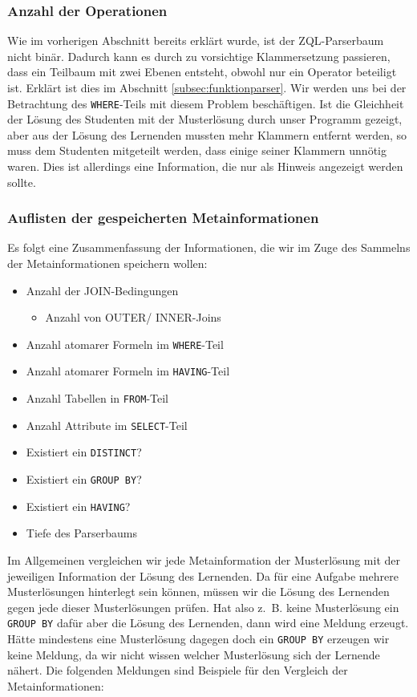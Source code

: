 \subsubsection*{Anzahl der Operationen}

Wie im vorherigen Abschnitt bereits erklärt wurde, ist der ZQL-Parserbaum nicht binär. Dadurch kann es durch zu vorsichtige Klammersetzung passieren, dass ein Teilbaum mit zwei Ebenen entsteht, obwohl nur ein Operator beteiligt ist. Erklärt ist dies im Abschnitt \ref{subsec:funktionparser}. Wir werden uns bei der Betrachtung des \verb|WHERE|-Teils mit diesem Problem beschäftigen. Ist die Gleichheit der Lösung des Studenten mit der Musterlösung durch unser Programm gezeigt, aber aus der Lösung des Lernenden mussten mehr Klammern entfernt werden, so muss dem Studenten mitgeteilt werden, dass einige seiner Klammern unnötig waren. Dies ist allerdings eine Information, die nur als Hinweis angezeigt werden sollte.

\subsubsection*{Auflisten der gespeicherten Metainformationen}

Es folgt eine Zusammenfassung der Informationen, die wir im Zuge des Sammelns der Metainformationen speichern wollen:

\begin{itemize}
\item Anzahl der JOIN-Bedingungen
	\begin{itemize}
	\item Anzahl von OUTER/ INNER-Joins
	\end{itemize}
\item Anzahl atomarer Formeln im \verb|WHERE|-Teil
\item Anzahl atomarer Formeln im \verb|HAVING|-Teil
\item Anzahl Tabellen in \verb|FROM|-Teil
\item Anzahl Attribute im \verb|SELECT|-Teil 
\item Existiert ein \verb|DISTINCT|?
\item Existiert ein \verb|GROUP BY|?  
\item Existiert ein \verb|HAVING|?
\item Tiefe des Parserbaums 
\end{itemize}

Im Allgemeinen vergleichen wir jede Metainformation der Musterlösung mit der jeweiligen Information der Lösung des Lernenden. Da für eine Aufgabe mehrere Musterlösungen hinterlegt sein können, müssen wir die Lösung des Lernenden gegen jede dieser Musterlösungen prüfen. Hat also \mbox{z. B.} keine Musterlösung ein \verb|GROUP BY| dafür aber die Lösung des Lernenden, dann wird eine Meldung erzeugt. Hätte mindestens eine Musterlösung dagegen doch ein \verb|GROUP BY| erzeugen wir keine Meldung, da wir nicht wissen welcher Musterlösung sich der Lernende nähert. Die folgenden Meldungen sind Beispiele für den Vergleich der Metainformationen:

